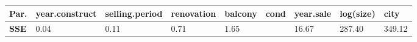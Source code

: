 

\begin{table}[]
\begin{tabular}{@{}lllllllll@{}}
\toprule
\textbf{Par.} & year.construct & selling.period & renovation & balcony & cond & year.sale & log(size) & city   \\ \midrule
\textbf{SSE} & 0.04           & 0.11           & 0.71       & 1.65    &      & 16.67     & 287.40    & 349.12 \\ \bottomrule
\end{tabular}
\end{table}

